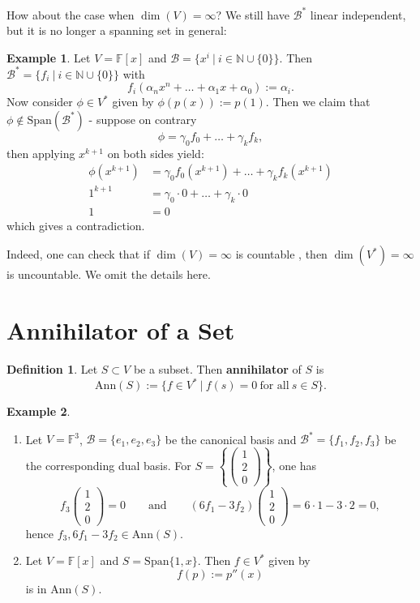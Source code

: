 \documentclass[11pt,openany]{book}
\theoremstyle{plain}
\theoremstyle{definition}
\newtheorem{definition}[definition]{Definition}
\newtheorem{example}[example]{Example}
\theoremstyle{remark}
\begin{document}
How about the case when $\dim(V) = \infty$? We still have $\mathcal{B}^*$ linear independent, but it is no longer a spanning set in general:
\begin{example}
    Let $V = \mathbb{F}[x]$ and $\mathcal{B} = \{x^i\ |\ i \in \mathbb{N} \cup \{0\}\}$. Then $\mathcal{B}^* = \{f_i\ |\ i \in \mathbb{N} \cup \{0\}\}$ with
    $$f_i(\alpha_n x^n + \dots + \alpha_1 x + \alpha_0) := \alpha_i.$$
    Now consider $\phi \in V^*$ given by $\phi(p(x)) := p(1)$. Then we claim that $\phi \notin \mathrm{Span}(\mathcal{B}^*)$ - suppose on contrary
    $$\phi = \gamma_0 f_0 + \dots + \gamma_k f_k,$$
    then applying $x^{k+1}$ on both sides yield:
    \begin{align*}
    \phi(x^{k+1}) &= \gamma_0 f_0(x^{k+1}) + \dots + \gamma_k f_k(x^{k+1}) \\
    1^{k+1} &= \gamma_0 \cdot 0 + \dots + \gamma_k \cdot 0 \\
    1 &= 0
    \end{align*}
    which gives a contradiction.
\end{example}
Indeed, one can check that if $\dim(V) = \infty$ is countable , then $\dim(V^*) = \infty$ is uncountable. We omit the details here.

\section{Annihilator of a Set}
\begin{definition}
    Let $S \subset V$ be a subset. Then {\bf annihilator} of $S$ is 
    $$\mathrm{Ann}(S) := \{f \in V^*\ |\ f(s) = 0\ \text{for all}\ s \in S\}.$$
\end{definition}

\begin{example}\
    \begin{enumerate}
        \item Let $V=\mathbb{F}^{3}$, $\mathcal{B}=\{e_1,e_2,e_3\}$ be the canonical basis and $\mathcal{B}^{*}=\{f_1,f_2,f_3\}$ be the corresponding dual basis. 
        For $S=\left\{ \begin{pmatrix}1\\2\\0\end{pmatrix} \right\}$, one has
        $$f_3\begin{pmatrix}1\\2\\0\end{pmatrix}=0\quad\quad\text{and}
        \quad\quad(6f_1-3f_2)\begin{pmatrix}1\\2\\0\end{pmatrix}=6\cdot 1-3\cdot 2=0,$$
        hence $f_3,6f_1-3f_2\in\mathrm{Ann}(S)$.
        \item Let $V=\mathbb{F}[x]$ and $S=\mathrm{Span}\{1,x\}$. Then $f\in V^{*}$ given by
        $$f(p):=p''(x)$$
        is in $\mathrm{Ann}(S)$.
    \end{enumerate}
\end{example}
\end{document}

